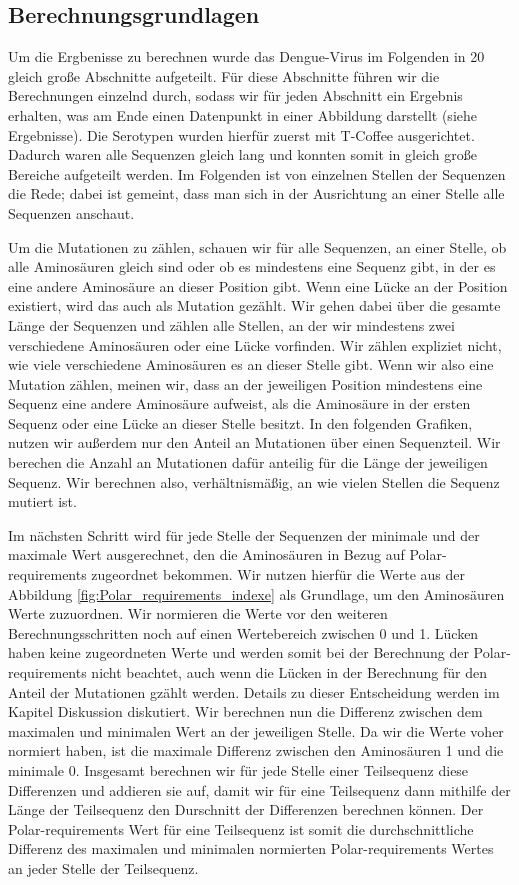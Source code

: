 \documentclass[german,version-2022-01]{uzl-thesis}
\begin{document}
\subsection{Berechnungsgrundlagen}
Um die Ergbenisse zu berechnen wurde das Dengue-Virus im Folgenden in 20 gleich gro\ss{}e Abschnitte aufgeteilt. F\"ur diese Abschnitte f\"uhren wir die Berechnungen einzelnd durch, sodass wir f\"ur jeden Abschnitt ein Ergebnis erhalten, was am Ende einen Datenpunkt in einer Abbildung darstellt (siehe Ergebnisse). Die Serotypen wurden hierf\"ur zuerst mit T-Coffee ausgerichtet. Dadurch waren alle Sequenzen gleich lang und konnten somit in gleich gro\ss{}e Bereiche aufgeteilt werden. Im Folgenden ist von einzelnen Stellen der Sequenzen die Rede; dabei ist gemeint, dass man sich in der Ausrichtung an einer Stelle alle Sequenzen anschaut. 

Um die Mutationen zu z\"ahlen, schauen wir f\"ur alle Sequenzen, an einer Stelle, ob alle Aminos\"auren gleich sind oder ob es mindestens eine Sequenz gibt, in der es eine andere Aminos\"aure an dieser Position gibt. Wenn eine L\"ucke an der Position existiert, wird das auch als Mutation gez\"ahlt. Wir gehen dabei \"uber die gesamte L\"ange der Sequenzen und z\"ahlen alle Stellen, an der wir mindestens zwei verschiedene Aminos\"auren oder eine L\"ucke vorfinden. Wir z\"ahlen expliziet nicht, wie viele verschiedene Aminos\"auren es an dieser Stelle gibt. Wenn wir also eine Mutation z\"ahlen, meinen wir, dass an der jeweiligen Position mindestens eine Sequenz eine andere Aminos\"aure aufweist, als die Aminos\"aure in der ersten Sequenz oder eine L\"ucke an dieser Stelle besitzt. In den folgenden Grafiken, nutzen wir au\ss{}erdem nur den Anteil an Mutationen \"uber einen Sequenzteil. Wir berechen die Anzahl an Mutationen daf\"ur anteilig f\"ur die L\"ange der jeweiligen Sequenz. Wir berechnen also, verh\"altnism\"a\ss{}ig, an wie vielen Stellen die Sequenz mutiert ist.

Im n\"achsten Schritt wird f\"ur jede Stelle der Sequenzen der minimale und der maximale Wert ausgerechnet, den die Aminos\"auren in Bezug auf Polar-requirements zugeordnet bekommen. Wir nutzen hierf\"ur die Werte aus der Abbildung \ref{fig:Polar_requirements_indexe} als Grundlage, um den Aminos\"auren Werte zuzuordnen. Wir normieren die Werte vor den weiteren Berechnungsschritten noch auf einen Wertebereich zwischen 0 und 1. L\"ucken haben keine zugeordneten Werte und werden somit bei der Berechnung der Polar-requirements nicht beachtet, auch wenn die L\"ucken in der Berechnung f\"ur den Anteil der Mutationen gz\"ahlt werden. Details zu dieser Entscheidung werden im Kapitel Diskussion diskutiert. Wir berechnen nun die Differenz zwischen dem maximalen und minimalen Wert an der jeweiligen Stelle. Da wir die Werte voher normiert haben, ist die maximale Differenz zwischen den Aminos\"auren 1 und die minimale 0. Insgesamt berechnen wir f\"ur jede Stelle einer Teilsequenz diese Differenzen und addieren sie auf, damit wir f\"ur eine Teilsequenz dann mithilfe der L\"ange der Teilsequenz den Durschnitt der Differenzen berechnen k\"onnen. Der Polar-requirements Wert f\"ur eine Teilsequenz ist somit die durchschnittliche Differenz des maximalen und minimalen normierten Polar-requirements Wertes an jeder Stelle der Teilsequenz. 
\end{document}
